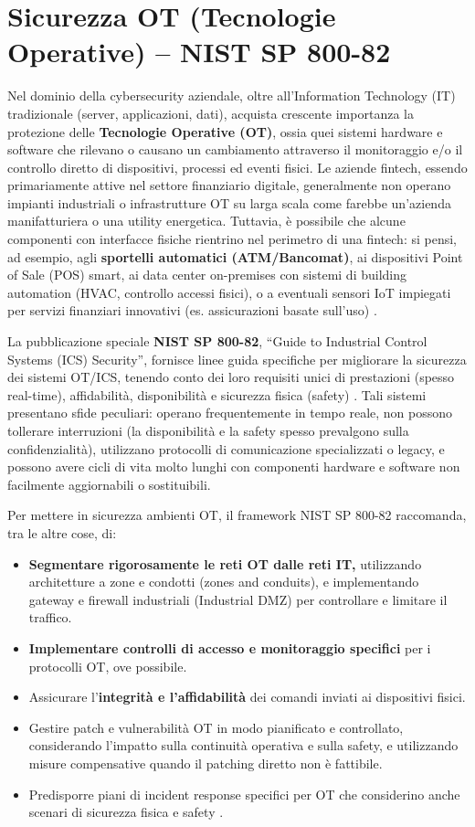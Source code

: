 \section{Sicurezza OT (Tecnologie Operative) – NIST SP 800-82}
\label{sec:sicurezza_ot}
Nel dominio della cybersecurity aziendale, oltre all'Information Technology (IT) tradizionale (server, applicazioni, dati), acquista crescente importanza la protezione delle \textbf{Tecnologie Operative (OT)}, ossia quei sistemi hardware e software che rilevano o causano un cambiamento attraverso il monitoraggio e/o il controllo diretto di dispositivi, processi ed eventi fisici. Le aziende fintech, essendo primariamente attive nel settore finanziario digitale, generalmente non operano impianti industriali o infrastrutture OT su larga scala come farebbe un'azienda manifatturiera o una utility energetica. Tuttavia, è possibile che alcune componenti con interfacce fisiche rientrino nel perimetro di una fintech: si pensi, ad esempio, agli \textbf{sportelli automatici (ATM/Bancomat)}, ai dispositivi Point of Sale (POS) smart, ai data center on-premises con sistemi di building automation (HVAC, controllo accessi fisici), o a eventuali sensori IoT impiegati per servizi finanziari innovativi (es. assicurazioni basate sull'uso) \cite{nistSP80082}.

La pubblicazione speciale \textbf{NIST SP 800-82}, \enquote{Guide to Industrial Control Systems (ICS) Security}, fornisce linee guida specifiche per migliorare la sicurezza dei sistemi OT/ICS, tenendo conto dei loro requisiti unici di prestazioni (spesso real-time), affidabilità, disponibilità e sicurezza fisica (safety) \cite{nistSP80082}. Tali sistemi presentano sfide peculiari: operano frequentemente in tempo reale, non possono tollerare interruzioni (la disponibilità e la safety spesso prevalgono sulla confidenzialità), utilizzano protocolli di comunicazione specializzati o legacy, e possono avere cicli di vita molto lunghi con componenti hardware e software non facilmente aggiornabili o sostituibili.

Per mettere in sicurezza ambienti OT, il framework NIST SP 800-82 raccomanda, tra le altre cose, di:
\begin{itemize}
    \item \textbf{Segmentare rigorosamente le reti OT dalle reti IT,} utilizzando architetture a zone e condotti (zones and conduits), e implementando gateway e firewall industriali (Industrial DMZ) per controllare e limitare il traffico.
    \item \textbf{Implementare controlli di accesso e monitoraggio specifici} per i protocolli OT, ove possibile.
    \item Assicurare l'\textbf{integrità e l'affidabilità} dei comandi inviati ai dispositivi fisici.
    \item Gestire patch e vulnerabilità OT in modo pianificato e controllato, considerando l'impatto sulla continuità operativa e sulla safety, e utilizzando misure compensative quando il patching diretto non è fattibile.
    \item Predisporre piani di incident response specifici per OT che considerino anche scenari di sicurezza fisica e safety \cite{nistSP80082}.
\end{itemize}

